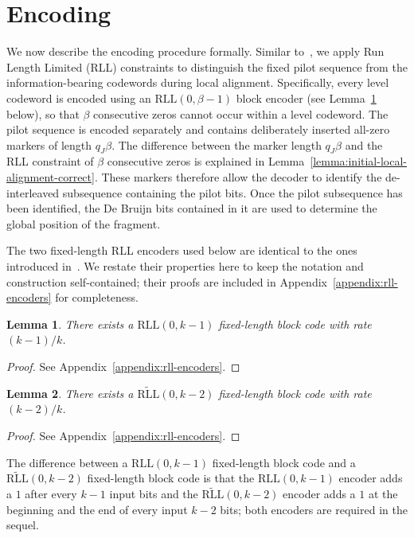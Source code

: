 \documentclass[journal,letterpaper,onecolumn,11pt]{IEEEtran}
\newtheorem{lemma}{Lemma}
\begin{document}
\section{Encoding}\label{Section:proposed-work encoding}
We now describe the encoding procedure formally. 
Similar to~\cite{liu2026improved}, we apply Run Length Limited (RLL) constraints to distinguish the fixed pilot sequence from the information-bearing codewords during local alignment. 
Specifically, every level codeword is encoded using an \(\mathrm{RLL}(0,\beta-1)\) block encoder (see Lemma~\ref{lemma:rll-beta-minus-one} below), so that \(\beta\) consecutive zeros cannot occur within a level codeword. 
The pilot sequence is encoded separately and contains deliberately inserted all-zero markers of length \(q_J\beta\). 
The difference between the marker length \(q_J\beta\) and the RLL constraint of \(\beta\) consecutive zeros is explained in Lemma~\ref{lemma:initial-local-alignment-correct}. 
These markers therefore allow the decoder to identify the de-interleaved subsequence containing the pilot bits. 
Once the pilot subsequence has been identified, the De Bruijn bits contained in it are used to determine the global position of the fragment.

The two fixed-length RLL encoders used below are identical to the ones
introduced in~\cite[Lemmas~1 and~2]{liu2026improved}. 
We restate their properties here to keep the notation and construction self-contained; their proofs are included in Appendix~\ref{appendix:rll-encoders} for completeness.
\begin{lemma}\label{lemma:rll-beta-minus-one}
There exists a $\mathrm{RLL}(0,k-1)$ fixed-length block code with rate $(k-1)/k$.
\end{lemma}
\begin{proof}
    See Appendix~\ref{appendix:rll-encoders}.
\end{proof}
\begin{lemma}\label{lemma:rll-beta-minus-two}
There exists a $\widetilde{\mathrm{RLL}}(0,k-2)$ fixed-length block code with rate $(k-2)/k$.
\end{lemma}
\begin{proof}
    See Appendix~\ref{appendix:rll-encoders}.
\end{proof}
The difference between a $\mathrm{RLL}(0,k-1)$ fixed-length block code and a $\widetilde{\mathrm{RLL}}(0,k-2)$ fixed-length block code is that the $\mathrm{RLL}(0,k-1)$ encoder adds a $1$ after every $k-1$ input bits and the $\widetilde{\mathrm{RLL}}(0,k-2)$ encoder adds a $1$ at the beginning and the end of every input $k-2$ bits; both encoders are required in the sequel.
\end{document}
